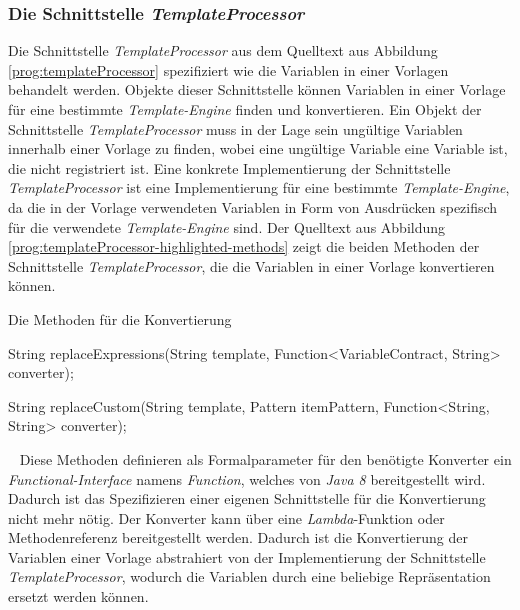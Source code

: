 \subsubsection{Die Schnittstelle \emph{TemplateProcessor}}
\label{sec:templateProcessor}
Die Schnittstelle \emph{TemplateProcessor} aus dem Quelltext aus Abbildung \ref{prog:templateProcessor} spezifiziert wie die Variablen in einer Vorlagen behandelt werden. Objekte dieser Schnittstelle können Variablen in einer Vorlage für eine bestimmte \emph{Template-Engine} finden und konvertieren. Ein Objekt der Schnittstelle \emph{TemplateProcessor} muss in der Lage sein ungültige Variablen innerhalb einer Vorlage zu finden, wobei eine ungültige Variable eine Variable ist, die nicht registriert ist. Eine konkrete Implementierung der Schnittstelle \emph{TemplateProcessor} ist eine Implementierung für eine bestimmte \emph{Template-Engine}, da die in der Vorlage verwendeten Variablen in Form von Ausdrücken spezifisch für die verwendete \emph{Template-Engine} sind. 
\newline
\newline
Der Quelltext aus Abbildung \ref{prog:templateProcessor-highlighted-methods} zeigt die beiden Methoden der Schnittstelle \emph{TemplateProcessor}, die die Variablen in einer Vorlage konvertieren können.
\newpage

\begin{program}[h]
\caption{Die Methoden für die Konvertierung}
\label{prog:templateProcessor-highlighted-methods}
\begin{JavaCode}[numbers=none]
String replaceExpressions(String template,
                          Function<VariableContract, String> converter);

String replaceCustom(String template,
                     Pattern itemPattern,
                     Function<String, String> converter);
\end{JavaCode}
\end{program}
\ \newline
Diese Methoden definieren als Formalparameter für den benötigte Konverter ein \emph{Functional-Interface} namens \emph{Function}, welches von \emph{Java 8} bereitgestellt wird. Dadurch ist das Spezifizieren einer eigenen Schnittstelle für die Konvertierung nicht mehr nötig. Der Konverter kann über eine \emph{Lambda}-Funktion oder Methodenreferenz bereitgestellt werden. Dadurch ist die Konvertierung der Variablen einer Vorlage abstrahiert von der Implementierung der Schnittstelle \emph{TemplateProcessor}, wodurch die Variablen durch eine beliebige Repräsentation ersetzt werden können.

